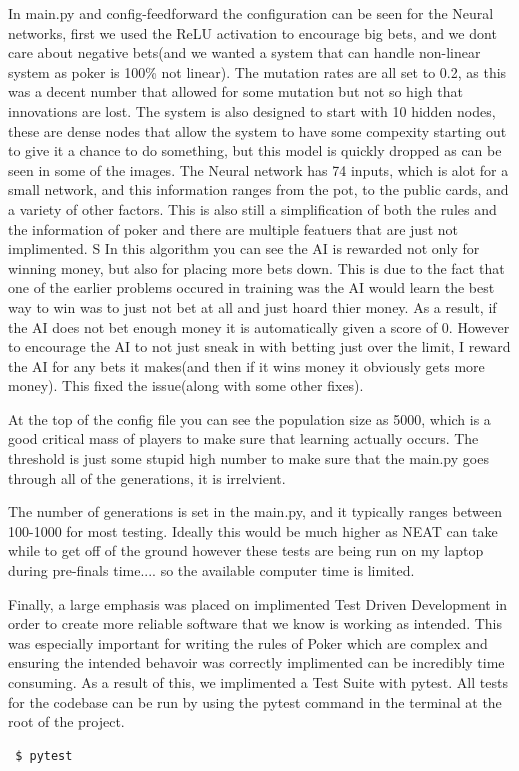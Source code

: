 In main.py and config-feedforward the configuration can be seen for the Neural networks, first we used the ReLU
activation to encourage big bets, and we dont care about negative bets(and we wanted a system that can handle
non-linear system as poker is 100\% not linear). The mutation rates are all set to 0.2, as this was a decent
number that allowed for some mutation but not so high that innovations are lost.
The system is also designed to start with 10 hidden nodes, these are dense nodes that allow the system to have
some compexity starting out to give it a chance to do something, but this model is quickly dropped as can be
seen in some of the images. The Neural network has 74 inputs, which is alot for a small network, and this
information ranges from the pot, to the public cards, and a variety of other factors. This is also still a
simplification of both the rules and the information of poker and there are multiple featuers that are just not implimented.
S
In this algorithm you can see the AI is rewarded not only for winning money, but also for placing more bets
down. This is due to the fact that one of the earlier problems occured in training was the AI would learn the
best way to win was to just not bet at all and just hoard thier money. As a result, if the AI does not bet
enough money it is automatically given a score of 0. However to encourage the AI to not just sneak in with betting just over the limit, I reward the AI for any bets it makes(and then if it wins money it obviously gets more
money). This fixed the issue(along with some other fixes).

At the top of the config file you can see the population size as 5000, which is a good critical mass of players
to make sure that learning actually occurs. The threshold is just some stupid high number to make sure that the
main.py goes through all of the generations, it is irrelvient.

The number of generations is set in the main.py, and it typically ranges between 100-1000 for most testing.
Ideally this would be much higher as NEAT can take while to get off of the ground however these tests are being
run on my laptop during pre-finals time.... so the available computer time is limited.

Finally, a large emphasis was placed on implimented Test Driven Development in order
to create more reliable software that we know is working as intended. This was especially important for writing
the rules of Poker which are complex and ensuring the intended behavoir was correctly implimented can be
incredibly time consuming. As a result of this, we implimented a Test Suite with pytest. All tests for the
codebase can be run by using the pytest command in the terminal at the root of the project.
\begin{verbatim}
 $ pytest
\end{verbatim}

